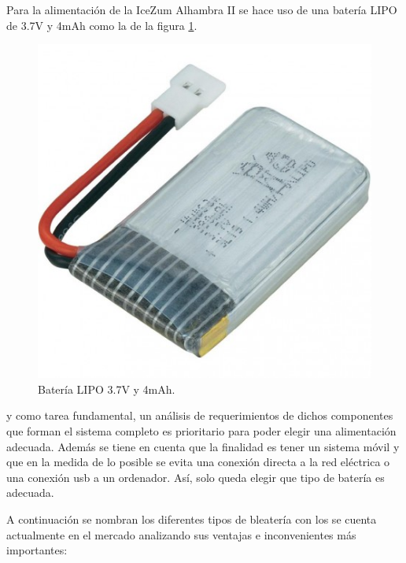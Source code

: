 Para la alimentación de la IceZum Alhambra II se hace uso de una batería LIPO de 3.7V y 4mAh como la de la figura \ref{fig:lipo37}. 
\begin{center}
	\begin{figure}[H]
		\center
		\includegraphics[scale=0.5]{imagenes/Balancing_Robot/LIPO37}
		\caption{Batería LIPO 3.7V y 4mAh.}
		\label{fig:lipo37}
	\end{figure}
\end{center}




y como tarea fundamental, un análisis de requerimientos de dichos componentes que forman el sistema completo es prioritario para poder elegir una alimentación adecuada. Además se tiene en cuenta que la finalidad es tener un sistema móvil y que en la medida de lo posible se evita una conexión directa a la red eléctrica o una conexión usb a un ordenador. Así, solo queda elegir que tipo de batería es adecuada. \newline

A continuación se nombran los diferentes tipos de bleatería con los se cuenta actualmente en el mercado analizando sus ventajas e inconvenientes más importantes: 

